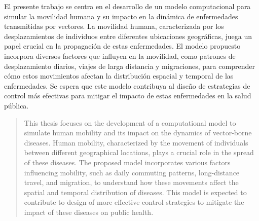 \begin{resumen}
	El presente trabajo se centra en el desarrollo de un modelo computacional para simular la movilidad humana y su impacto en la dinámica de enfermedades transmitidas por vectores. La movilidad humana, caracterizada por los desplazamientos de individuos entre diferentes ubicaciones geográficas, juega un papel crucial en la propagación de estas enfermedades.  El modelo propuesto incorpora diversos factores que influyen en la movilidad, como patrones de desplazamiento diarios, viajes de larga distancia y migraciones, para comprender cómo estos movimientos afectan la distribución espacial y temporal de las enfermedades.  Se espera que este modelo contribuya al diseño de estrategias de control más efectivas para mitigar el impacto de estas enfermedades en la salud pública.
	\end{resumen}
	
	\begin{abstract}
	This thesis focuses on the development of a computational model to simulate human mobility and its impact on the dynamics of vector-borne diseases. Human mobility, characterized by the movement of individuals between different geographical locations, plays a crucial role in the spread of these diseases. The proposed model incorporates various factors influencing mobility, such as daily commuting patterns, long-distance travel, and migration, to understand how these movements affect the spatial and temporal distribution of diseases. This model is expected to contribute to design of more effective control strategies to mitigate the impact of these diseases on public health.
	\end{abstract}